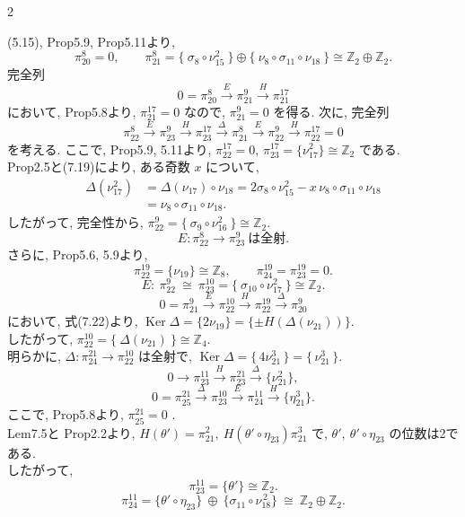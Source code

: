 \documentclass[10pt, leqno]{ltjsarticle}
\newcommand{\gen}[1]{\{#1\}}       %
\newcommand{\Ker}{\operatorname{Ker}}
\newcommand{\pit}[2]{\pi_{#1}^{#2}}
\numberwithin{equation}{section}
\theoremstyle{plain}
\theoremstyle{definition}
\theoremstyle{remark}
\begin{document}
\begin{paracol}{2}

\noindent
(5.15), Prop5.9, Prop5.11より,
\[
\pi_{20}^{8}=0,\qquad
\pi_{21}^{8}=\gen{\ \sigma_{8}\circ\nu_{15}^{2}\ }\oplus\gen{\ \nu_{8}\circ\sigma_{11}\circ\nu_{18}\ }\cong\mathbb{Z}_2\oplus\mathbb{Z}_2.
\]
完全列
\[
0=\pi_{20}^{8}\xrightarrow{\,E\,}\pi_{21}^{9}\xrightarrow{\,H\,}\pi_{21}^{17}
\]
において,  Prop5.8より, \(\pi_{21}^{17}=0\) なので,
\(\pi_{21}^{9}=0\) を得る. 
次に, 完全列
\[
\pi_{22}^{8}\xrightarrow{\,E\,}\pi_{23}^{9}\xrightarrow{\,H\,}\pi_{23}^{17}
\xrightarrow{\Delta}\pit{21}{8}\xrightarrow{E}\pit{22}{9}
\xrightarrow{H}\pit{22}{17} = 0
\]
を考える. ここで, Prop5.9, 5.11より,
\(\pi_{22}^{17}=0\),
\(\pi_{23}^{17}=\gen{\nu_{17}^{2}}\cong\mathbb{Z}_2\) である. \\
 Prop2.5と(7.19)により, ある奇数 \(x\) について,
\[
\begin{align*}
\Delta(\nu_{17}^{2})
& = \Delta(\nu_{17})\circ\nu_{18}
= 2\sigma_{8}\circ\nu_{15}^{2}-x\,\nu_{8}\circ\sigma_{11}\circ\nu_{18}\\
& = \nu_{8}\circ\sigma_{11}\circ\nu_{18}.  
\end{align*}
\]
したがって, 完全性から,
\(
\pi_{22}^{9}=\gen{\ \sigma_{9}\circ\nu_{16}^{2}\ }\cong\mathbb{Z}_2.
\)
\begin{equation}
E:\pi_{22}^{8}\longrightarrow\pi_{23}^{9}\ \text{は全射}.
\end{equation}
さらに, Prop5.6, 5.9より,
\[
\pi_{22}^{19}=\gen{\nu_{19}}\cong\mathbb{Z}_8,\qquad
\pi_{24}^{19} = \pit{23}{19} = 0.
\]
\[
E:\ \pi_{22}^{9}\ \cong\ \pi_{23}^{10}
=\gen{\ \sigma_{10}\circ\nu_{17}^{2}\ }\cong\mathbb{Z}_2.
\]
\[
0 = \pi_{21}^{9}\xrightarrow{\,E\,}\pi_{22}^{10}
\xrightarrow{\,H\,}\pi_{22}^{19}\xrightarrow{\,\Delta\,}\pi_{20}^{9}
\]
において, 式(7.22)より, 
\(
\Ker \Delta = \gen{2\nu_{19}} = \gen{\pm H(\Delta(\nu_{21}))}.
\)\\
したがって,
\(
\pi_{22}^{10}=\gen{\ \Delta(\nu_{21})\ }\cong\mathbb{Z}_4 .
\)\\
明らかに, \(\Delta:\pi_{24}^{21}\to\pi_{22}^{10}\) は全射で, 
\(\Ker\Delta = \gen{\,4\nu_{21}^{3}\,}=\gen{\,\nu_{21}^{3}\,}\). 
\[
0\longrightarrow\pi_{23}^{11}\xrightarrow{\,H\,}\pi_{23}^{21}
\xrightarrow{\,\Delta\,}\gen{\nu_{21}^{2}},
\]
\[
0 = \pi_{25}^{21}\xrightarrow{\,\Delta\,}\pi_{23}^{10}\xrightarrow{\,E\,}\pi_{24}^{11}
\xrightarrow{\,H\,}\gen{\eta_{21}^3}.
\]
ここで, Prop5.8より, \(\pi_{25}^{21}=0\) . \\
Lem7.5と Prop2.2より, 
\(H(\theta') = \pi_{21}^{2},\ H(\theta'\circ \eta_{23})\pi_{21}^{3}\) で, 
\(\theta',\ \theta'\circ\eta_{23}\) の位数は2である. \\
したがって,
\[
\pi_{23}^{11}=\gen{\theta'}\cong\mathbb{Z}_2 .
\]
\[
\pi_{24}^{11}=\gen{\theta'\circ\eta_{23}}\ \oplus\ \gen{\sigma_{11}\circ\nu_{18}^{\,2}}
\ \cong\ \mathbb{Z}_2\oplus\mathbb{Z}_2 .
\]


\end{paracol}
\end{document}
